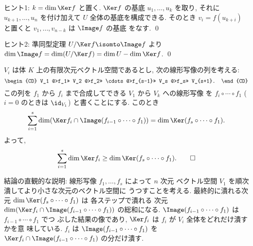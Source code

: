 \documentclass[12pt,twoside]{jarticle}
\begin{document}
\medskip
\noindent
ヒント1: $k = \dim\Ker f$ と置く.  $\Ker f$ の基底 $u_1,\dots,u_k$ を取り, 
それに $u_{k+1},\dots,u_n$ を付け加えて $U$ 全体の基底を構成できる.
そのとき $v_i=f(u_{k+i})$ と置くと $v_1,\dots,v_{n-k}$ は $\Image f$ の基底
をなす. 
\qed

\medskip
\noindent
ヒント2: 準同型定理 $U/\Ker f \isomto \Image f$ 
より $\dim\Image f = \dim(U/\Ker f) = \dim U - \dim\Ker f$.
\qed


\begin{question}
\label{q:Ker-Image-2}
  $V_i$ は体 $K$ 上の有限次元ベクトル空間であるとし, 
  次の線形写像の列を考える:
  \begin{equation*}
  \begin{CD}
    V_1 @>f_1>> V_2 @>f_2>> \cdots @>f_{s-1}>> V_s @>f_s>> V_{s+1}.
  \end{CD}
  \end{equation*}
  この列を $f_1$ から $f_i$ まで合成してできる $V_1$ から $V_k$ への線形写像
  を $f_i\circ\cdots\circ f_1$ ($i=0$ のときは $\id_{V_1}$) と書くことにする.
  このとき
  \begin{equation*}
    \sum_{i=1}^s \dim(\Ker f_i \cap \Image(f_{i-1}\circ\cdots\circ f_1))
    = \dim\Ker(f_s\circ\cdots\circ f_1).
  \end{equation*}
  よって,
  \begin{equation*}
    \sum_{i=1}^s \dim\Ker f_i
    \ge \dim\Ker(f_s\circ\cdots\circ f_1).
    \qed
  \end{equation*}
\end{question}

\noindent
結論の直観的な説明: 線形写像 $f_1,\dots,f_s$ によって $n$ 次元
ベクトル空間 $V_1$ を順次潰してより小さな次元のベクトル空間に
うつすことを考える.  
最終的に潰れる次元 $\dim\Ker(f_s\circ\cdots\circ f_1)$ は
各ステップで潰れる
次元 $\dim(\Ker f_i \cap \Image(f_{i-1}\circ\cdots\circ f_1))$ の総和になる.
$\Image(f_{i-1}\circ\cdots\circ f_1)$ は $f_{i-1}\circ\cdots\circ f_1$ でつ
ぶした結果の像であり, $\Ker f_i$ は $f_i$ が $V_i$ 全体をどれだけ潰すかを意
味している. $f_i$ は $\Image(f_{i-1}\circ\cdots\circ f_1)$ 
を $\Ker f_i \cap \Image(f_{i-1}\circ\cdots\circ f_1)$ の分だけ潰す.
\end{document}
